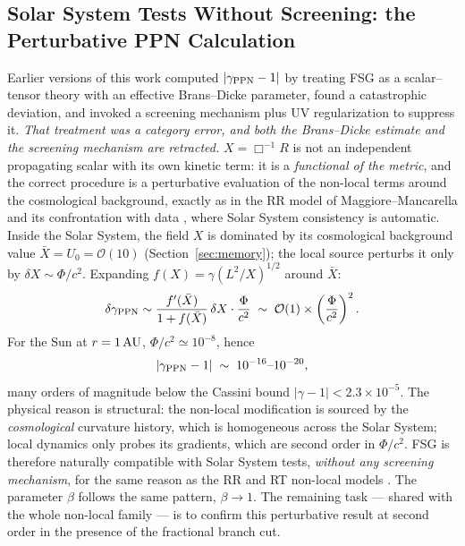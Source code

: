 \documentclass[11pt,a4paper]{article}
\begin{document}
\begin{onehalfspacing}
\subsection{Solar System Tests Without Screening: the Perturbative PPN Calculation}
Earlier versions of this work computed $|\gamma_{\rm PPN}-1|$ by treating FSG as a scalar--tensor theory with an effective Brans--Dicke parameter, found a catastrophic deviation, and invoked a screening mechanism plus UV regularization to suppress it. \emph{That treatment was a category error, and both the Brans--Dicke estimate and the screening mechanism are retracted.} $X = \Box^{-1}R$ is not an independent propagating scalar with its own kinetic term: it is a \emph{functional of the metric}, and the correct procedure is a perturbative evaluation of the non-local terms around the cosmological background, exactly as in the RR model of Maggiore--Mancarella \cite{Maggiore2014} and its confrontation with data \cite{Dirian2014}, where Solar System consistency is automatic.
Inside the Solar System, the field $X$ is dominated by its cosmological background value $\bar{X} = U_0 = \mathcal{O}(10)$ (Section~\ref{sec:memory}); the local source perturbs it only by $\delta X \sim \Phi/c^2$. Expanding $f(X) = \gamma(L^2/X)^{1/2}$ around $\bar{X}$:
\begin{equation}
\delta\gamma_{\rm PPN} \sim \frac{f'(\bar{X})}{1+f(\bar{X})}\,\delta X \cdot \frac{\Phi}{c^2}
\;\sim\; \mathcal{O}(1)\times\left(\frac{\Phi}{c^2}\right)^{2}.
\end{equation}
For the Sun at $r = 1\,{\rm AU}$, $\Phi/c^2 \simeq 10^{-8}$, hence
\begin{equation}
|\gamma_{\rm PPN} - 1| \;\sim\; 10^{-16} \text{--} 10^{-20},
\end{equation}
many orders of magnitude below the Cassini bound $|\gamma - 1| < 2.3\times10^{-5}$. The physical reason is structural: the non-local modification is sourced by the \emph{cosmological} curvature history, which is homogeneous across the Solar System; local dynamics only probes its gradients, which are second order in $\Phi/c^2$. FSG is therefore naturally compatible with Solar System tests, \emph{without any screening mechanism}, for the same reason as the RR and RT non-local models \cite{Maggiore2014,Dirian2014}. The parameter $\beta$ follows the same pattern, $\beta \to 1$. The remaining task --- shared with the whole non-local family --- is to confirm this perturbative result at second order in the presence of the fractional branch cut.

\end{onehalfspacing}
\end{document}
